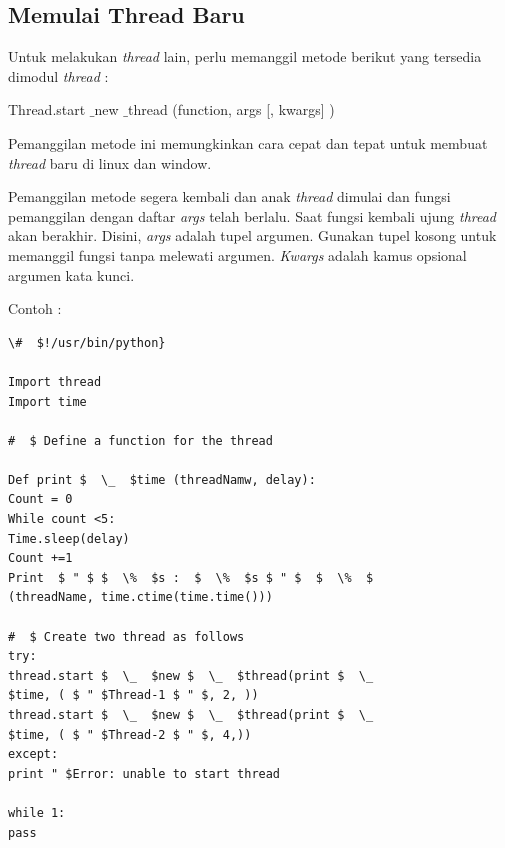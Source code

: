 \subsection{Memulai Thread Baru} \par
\noindent 
\hspace*{0.5in} Untuk melakukan \textit{thread} lain, perlu memanggil metode berikut yang tersedia dimodul \textit{thread} : \par
\noindent 
\begin{center}{\fontsize{9pt}{9pt}\selectfont Thread.start $  \_  $new $  \_  $thread (function, args [, kwargs] )}\end{center} \par
Pemanggilan metode ini memungkinkan cara cepat dan tepat untuk membuat \textit{thread} baru di linux dan window. \par
\hspace*{0.5in} Pemanggilan metode segera kembali dan anak  \textit{thread} dimulai dan fungsi pemanggilan dengan daftar \textit{args} telah berlalu. Saat fungsi kembali ujung \textit{thread} akan berakhir. Disini, \textit{args }adalah tupel argumen. Gunakan tupel kosong untuk memanggil fungsi tanpa melewati argumen. \textit{Kwargs} adalah kamus opsional argumen kata kunci.  \par

\vspace{12pt}
Contoh : 
\begin{verbatim}
\#  $!/usr/bin/python} 

Import thread
Import time

#  $ Define a function for the thread 

Def print $  \_  $time (threadNamw, delay):
Count = 0
While count <5:
Time.sleep(delay)
Count +=1 
Print  $ " $ $  \%  $s :  $  \%  $s $ " $  $  \%  $ 
(threadName, time.ctime(time.time()))

#  $ Create two thread as follows
try:
thread.start $  \_  $new $  \_  $thread(print $  \_  
$time, ( $ " $Thread-1 $ " $, 2, ))
thread.start $  \_  $new $  \_  $thread(print $  \_  
$time, ( $ " $Thread-2 $ " $, 4,))
except: 
print " $Error: unable to start thread 

while 1:
pass 
\end{verbatim}

